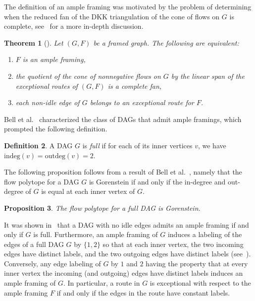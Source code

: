 \documentclass[12pt]{amsart}
\newtheorem{theorem}{Theorem}[section]
\newtheorem{proposition}[theorem]{Proposition}
\theoremstyle{definition}
\newtheorem{definition}[theorem]{Definition}
\newcommand{\defn}[1]{\emph{\color{blue} #1}}
\newcommand\indeg{\mathrm{indeg}}
\newcommand\outdeg{\mathrm{outdeg}}
\begin{document}
The definition of an ample framing was motivated by the problem of determining when the reduced fan of the DKK triangulation of the cone of flows on $G$ is complete, see~\cite{DKK12, PPS} for a more in-depth discussion.
\begin{theorem}[{\cite[Proposition 5]{DKK12}}]
Let $(G,F)$ be a framed graph.  
The following are equivalent:
\begin{enumerate}
    \item $F$ is an ample framing,
    \item the quotient of the cone of nonnegative flows on $G$ by the linear span of the exceptional routes of $(G,F)$ is a complete fan,
    \item each non-idle edge of $G$ belongs to an exceptional route for $F$.
\end{enumerate}
\end{theorem}



Bell et al.~\cite[Section 3]{Polytopes2} characterized the class of DAGs that admit ample framings, which prompted the following definition. 

\begin{definition}
A DAG $G$ is \defn{full} if for each of its inner vertices $v$, we have $\indeg(v)= \outdeg(v) = 2$.
\end{definition}

The following proposition follows from a result of Bell et al.~\cite{Polytopes2}, namely that the flow polytope for a DAG $G$ is Gorenstein if and only if the in-degree and out-degree of $G$ is equal at each inner vertex of $G$.

\begin{proposition}\label{prop:fullgorenstein}
    The flow polytope for a full DAG is Gorenstein.
\end{proposition}

It was shown in~\cite[Corollary 3.14]{Polytopes2} that a DAG with no idle edges admits an ample framing if and only if $G$ is full.
Furthermore, an ample framing of $G$ induces a labeling of the edges of a full DAG $G$ by $\{1,2\}$ so that at each inner vertex, the two incoming edges have distinct labels, and the two outgoing edges have distinct labels (see~\cite[Corollary 3.11]{Polytopes2}).
Conversely, any edge labeling of $G$ by $1$ and $2$ having the property that at every inner vertex the incoming (and outgoing) edges have distinct labels induces an ample framing of $G$.
In particular, a route in $G$ is exceptional with respect to the ample framing $F$ if and only if the edges in the route have constant labels.
\end{document}
